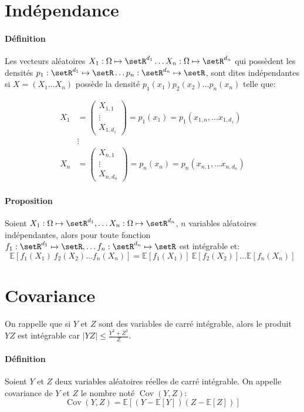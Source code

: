 \documentclass[a4paper,10pt,french,openany]{memoir}
\newcommand{\Esper}{\mathbb{E}}
\newcommand{\abs}[1]{\lvert #1 \rvert}
\newcommand{\Xonen}{X_1\dots X_n}
\DeclareMathOperator{\Cov}{Cov}
\begin{document}
\section{Indépendance}

\paragraph{Définition}
Les vecteurs aléatoires $X_1:\Omega \mapsto \setR^{d_1}\dots X_n:\Omega \mapsto \setR^{d_n}$ qui possèdent les densités $p_1:\setR^{d_1}\mapsto \setR\dots p_n:\setR^{d_n} \mapsto \setR$, sont dites indépendantes si $X=(\Xonen)$ possède la densité $p_1(x_1) p_2(x_2) \dots p_n (x_n)$ telle que:

\begin{align*}
 X_1 &= \begin{pmatrix}X_{1,1}\\\vdots\\X_{1,d_1}\end{pmatrix} = p_1(x_1) = p_1(x_{1,n},\dots x_{1,d_1})\\
 & \vdots \\
 X_n &= \begin{pmatrix}X_{n,1}\\\vdots\\X_{n,d_n}\end{pmatrix} = p_n(x_n) = p_n(x_{n,1},\dots x_{n,d_n})
\end{align*}

\paragraph{Proposition}
Soient $X_1:\Omega \mapsto \setR^{d_1}, \dots X_n:\Omega \mapsto \setR^{d_n}$, $n$ variables aléatoires indépendantes, alors pour toute fonction $f_1:\setR^{d_1}\mapsto \setR, \dots f_n:\setR^{d_n}\mapsto \setR$ est intégrable et:
\[\Esper[f_1(X_1)\: f_2(X_2) \dots f_n(X_n)] = \Esper[f_1(X_1)]\: \Esper[f_2(X_2)] \dots \Esper[f_n(X_n)]\]

\section{Covariance}
On rappelle que si $Y$ et $Z$ sont des variables de carré intégrable, alors le produit $YZ$ est intégrable car $\abs{YZ}\leq\frac{Y^2 + Z^2}{Z}$.

\paragraph{Définition}
Soient $Y$ et $Z$ deux variables aléatoires réelles de carré intégrable. On appelle covariance de $Y$ et $Z$ le nombre noté $\Cov(Y,Z)$:
\[ \Cov(Y,Z)=\Esper\left[(Y-\Esper[Y])(Z-\Esper[Z])\right] \]
\end{document}
